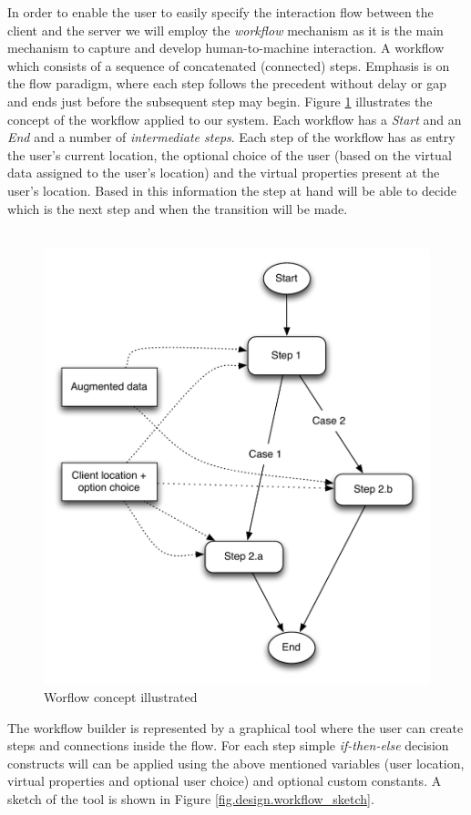 In order to enable the user to easily specify the interaction flow between the client and the server we will employ the \emph{workflow} mechanism as it is the main mechanism to  capture and develop human-to-machine interaction. A workflow which consists of a sequence of concatenated (connected) steps. Emphasis is on the flow paradigm, where each step follows the precedent without delay or gap and ends just before the subsequent step may begin. Figure \ref{fig.design.workflow} illustrates the concept of the workflow applied to our system. Each workflow has a \emph{Start} and an \emph{End} and a number of \emph{intermediate steps}. Each step of the workflow has as entry the user's current location, the optional choice of the user (based on the virtual data assigned to the user's location) and the virtual properties present at the user's location. Based in this information the step at hand will be able to decide which is the next step and when the transition will be made.
\\\\
\begin{figure}[H]
	\centering
	\includegraphics[width=0.9\linewidth]{fig/workflow}
	\caption{Worflow concept illustrated}
	\label{fig.design.workflow}
\end{figure}
The workflow builder is represented by a graphical tool where the user can create steps and connections inside the flow. For each step simple \emph{if-then-else} decision constructs will can be applied using the above mentioned variables (user location, virtual properties and optional user choice) and optional custom constants. A sketch of the tool is shown in Figure \ref{fig.design.workflow_sketch}.
